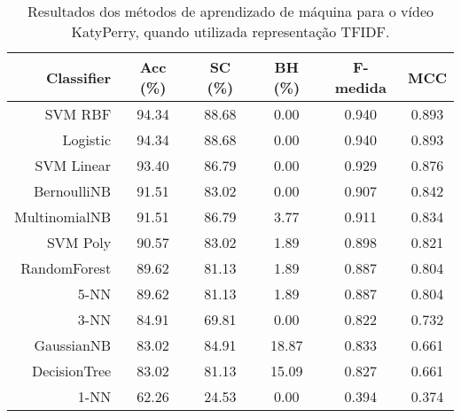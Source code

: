 \begin{table}[!htb]
\centering
\caption{Resultados dos métodos de aprendizado de máquina para o vídeo KatyPerry, quando utilizada representação TFIDF.}
\label{tab:KatyPerry-tfidf}
\begin{tabular}{r|c|c|c|c|c}
\hline\hline
Classifier & Acc (\%) & SC (\%) & BH (\%) & F-medida & MCC \\ \hline
SVM RBF & 94.34 & 88.68 & 0.00 & 0.940 & 0.893 & \\
Logistic & 94.34 & 88.68 & 0.00 & 0.940 & 0.893 & \\
SVM Linear & 93.40 & 86.79 & 0.00 & 0.929 & 0.876 & \\
BernoulliNB & 91.51 & 83.02 & 0.00 & 0.907 & 0.842 & \\
MultinomialNB & 91.51 & 86.79 & 3.77 & 0.911 & 0.834 & \\
SVM Poly & 90.57 & 83.02 & 1.89 & 0.898 & 0.821 & \\
RandomForest & 89.62 & 81.13 & 1.89 & 0.887 & 0.804 & \\
5-NN & 89.62 & 81.13 & 1.89 & 0.887 & 0.804 & \\
3-NN & 84.91 & 69.81 & 0.00 & 0.822 & 0.732 & \\
GaussianNB & 83.02 & 84.91 & 18.87 & 0.833 & 0.661 & \\
DecisionTree & 83.02 & 81.13 & 15.09 & 0.827 & 0.661 & \\
1-NN & 62.26 & 24.53 & 0.00 & 0.394 & 0.374 & \\
\hline\hline
\end{tabular}
\end{table}
